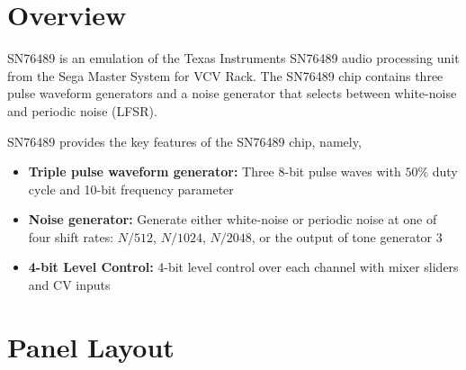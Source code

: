 \documentclass[12pt,a4paper]{article}
\begin{document}

\section{Overview}

SN76489 is an emulation of the Texas Instruments SN76489 audio processing unit from the Sega Master System for VCV Rack. The SN76489 chip contains three pulse waveform generators and a noise generator that selects between white-noise and periodic noise (LFSR).

SN76489 provides the key features of the SN76489 chip, namely,
\begin{itemize}
  \item \textbf{Triple pulse waveform generator:} Three 8-bit pulse waves with $50\%$ duty cycle and 10-bit frequency parameter
  \item \textbf{Noise generator:} Generate either white-noise or periodic noise at one of four shift rates: $N/512$, $N/1024$, $N/2048$, or the output of tone generator 3
  \item \textbf{4-bit Level Control:} 4-bit level control over each channel with mixer sliders and CV inputs
\end{itemize}


\section{Panel Layout}
\end{document}
